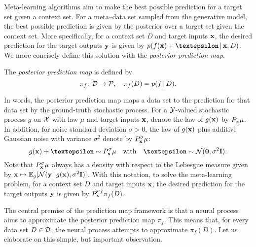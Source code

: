 \documentclass[12pt, twoside]{report}
\begin{document}
Meta-learning algorithms aim to make the best possible prediction for a target set given a context set.
For a meta--data set sampled from the generative model, the best possible prediction is given by the posterior over a target set given the context set.
More specifically, for a context set $D$ and target inputs $\mathbf{x}$, the desired prediction for the target outputs $\mathbf{y}$ is given by
$p(f(\vx) + \vep \cond \vx, D)$.
We more concisely define this solution with the \emph{posterior prediction map}.

\begin{definition}
    \label{def:posterior_prediction_map}
    The \emph{posterior prediction map} is defined by
    \begin{equation}
        \pi_f \colon \mathcal{D} \to \mathcal{P}, \quad
        \pi_f(D) = p(f \,|\, D).
    \end{equation}
\end{definition}

In words, the posterior prediction map maps a data set to the prediction for that data set by the ground-truth stochastic process.
For a $\mathcal{Y}$-valued stochastic process $g$ on $\mathcal{X}$ with law $\mu$ and target inputs $\mathbf{x}$,
 denote the law of $g(\mathbf{x})$ by $P_{\mathbf{x}} \mu$.
In addition, for noise standard deviation $\sigma > 0$, the law of $g(\mathbf{x})$ plus additive Gaussian noise with variance $\sigma^2$ denote by $P^\sigma_{\mathbf{x}} \mu$:
\begin{equation}
    g(\vx) + \vep \sim P^\sigma_\vx \mu
    \quad\text{with}\quad
    \vep \sim \Normal(\vnull, \sigma^2 \mI).
\end{equation}
Note that $P^\sigma_{\mathbf{x}} \mu$ always has a density with respect to the Lebesgue measure given by $\mathbf{x} \mapsto \mathbb{E}_g[\mathcal{N}(\mathbf{y} \,|\, g(\mathbf{x}), \sigma^2 \mathbf{I})]$.
With this notation, to solve the meta-learning problem, for a context set $D$ and target inputs $\mathbf{x}$, the desired prediction for the target outputs $\mathbf{y}$ is given by $P^{\sigma_f}_{\mathbf{x}} \pi_f(D)$.

The central premise of the prediction map framework is that a neural process aims to approximate the posterior prediction map $\pi_f$.
This means that, for every data set $D \in \mathcal{D}$, the neural process attempts to approximate $\pi_f(D)$.
Let us elaborate on this simple, but important observation.
\end{document}
